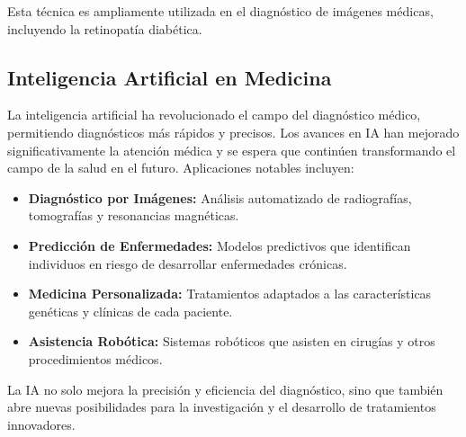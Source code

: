 Esta técnica es ampliamente utilizada en el diagnóstico de imágenes médicas, incluyendo la retinopatía diabética.

\subsection{Inteligencia Artificial en Medicina}

La inteligencia artificial ha revolucionado el campo del diagnóstico médico, permitiendo diagnósticos más rápidos y precisos. Los avances en IA han mejorado significativamente la atención médica y se espera que continúen transformando el campo de la salud en el futuro. Aplicaciones notables incluyen:

\begin{itemize}
 \item \textbf{Diagnóstico por Imágenes:} Análisis automatizado de radiografías, tomografías y resonancias magnéticas.
 \item \textbf{Predicción de Enfermedades:} Modelos predictivos que identifican individuos en riesgo de desarrollar enfermedades crónicas.
 \item \textbf{Medicina Personalizada:} Tratamientos adaptados a las características genéticas y clínicas de cada paciente.
 \item \textbf{Asistencia Robótica:} Sistemas robóticos que asisten en cirugías y otros procedimientos médicos.
\end{itemize}

La IA no solo mejora la precisión y eficiencia del diagnóstico, sino que también abre nuevas posibilidades para la investigación y el desarrollo de tratamientos innovadores.

